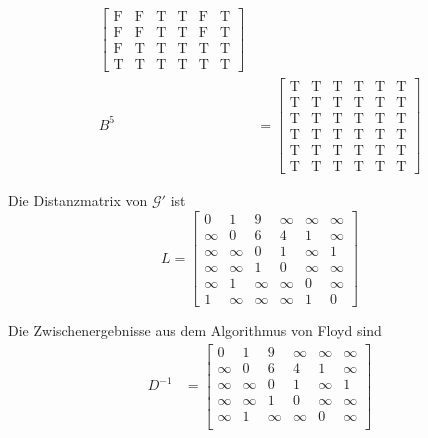 \documentclass[a4paper,11pt]{article}             %
\begin{document}
\begin{ex}
\begin{exlist}
\begin{align*}
\begin{bmatrix}
\text{F} & \text{F} & \text{T} & \text{T} & \text{F} & \text{T}  \\
\text{F} & \text{F} & \text{T} & \text{T} & \text{F} & \text{T}  \\
\text{F} & \text{T} & \text{T} & \text{T} & \text{T} & \text{T}  \\
\text{T} & \text{T} & \text{T} & \text{T} & \text{T} & \text{T} 
\end{bmatrix} \\
B^{5} &=
\begin{bmatrix}
\text{T} & \text{T} & \text{T} & \text{T} & \text{T} & \text{T}  \\
\text{T} & \text{T} & \text{T} & \text{T} & \text{T} & \text{T}  \\
\text{T} & \text{T} & \text{T} & \text{T} & \text{T} & \text{T}  \\
\text{T} & \text{T} & \text{T} & \text{T} & \text{T} & \text{T}  \\
\text{T} & \text{T} & \text{T} & \text{T} & \text{T} & \text{T}  \\
\text{T} & \text{T} & \text{T} & \text{T} & \text{T} & \text{T} 
\end{bmatrix}\end{align*}
\item Die Distanzmatrix von $\mathcal{G}'$ ist 
\begin{equation*}
  L=
\begin{bmatrix}
0 & 1 & 9 & \infty & \infty & \infty  \\
\infty & 0 & 6 & 4 & 1 & \infty  \\
\infty & \infty & 0 & 1 & \infty & 1  \\
\infty & \infty & 1 & 0 & \infty & \infty  \\
\infty & 1 & \infty & \infty & 0 & \infty  \\
1 & \infty & \infty & \infty & 1 & 0 
\end{bmatrix}
\end{equation*}
\item Die Zwischenergebnisse aus dem Algorithmus von Floyd sind
  \begin{align*}
D^{-1} &=
\begin{bmatrix}
0 & 1 & 9 & \infty & \infty & \infty  \\
\infty & 0 & 6 & 4 & 1 & \infty  \\
\infty & \infty & 0 & 1 & \infty & 1  \\
\infty & \infty & 1 & 0 & \infty & \infty  \\
\infty & 1 & \infty & \infty & 0 & \infty  \\

\end{bmatrix}
\end{align*}
\end{exlist}
\end{ex}
\end{document}
